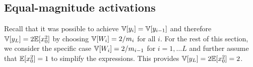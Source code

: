 
%
%


\subsection{Equal-magnitude activations}

Recall that it was possible to achieve $\mathbb{V}[y_{i}] = \mathbb{V}[y_{i-1}]$ and therefore $\mathbb{V}[y_{L}] = 2 \mathbb{E}[x_{0}^2]$ by choosing $\mathbb{V}[W_{i}] = 2 / m_{i}$ for all $i$.
For the rest of this section, we consider the specific case $\mathbb{V}[W_{i}] = 2 / m_{i-1}$ for $i = 1, \dots L$ and further assume that $\mathbb{E}[x_{0}^{2}] = 1$ to simplify the expressions.
This provides $\mathbb{V}[y_{L}] = 2 \mathbb{E}[x_{0}^2] = 2$.

